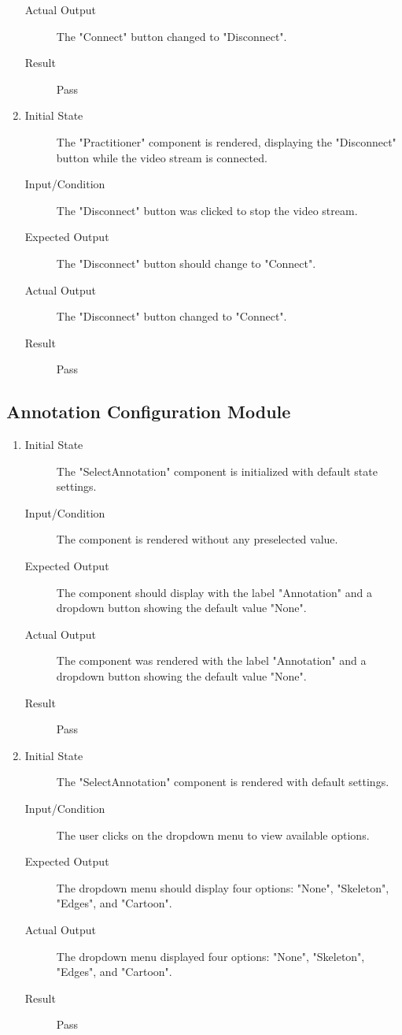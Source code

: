 \documentclass[12pt, titlepage]{article}
\begin{document}
\begin{enumerate}[UT-PV1]
\begin{description}
    \item[Actual Output]  The "Connect" button changed to "Disconnect".
    \item[Result] Pass
    \end{description}
  \item \label{UT-PV4}
    \begin{description}
    \item[Initial State] The "Practitioner" component is rendered, displaying the "Disconnect" button while the video stream is connected.
    \item[Input/Condition] The "Disconnect" button was clicked to stop the video stream.
    \item[Expected Output] The "Disconnect" button should change to "Connect".
    \item[Actual Output] The "Disconnect" button changed to "Connect".
    \item[Result] Pass
    \end{description}
\end{enumerate}

\subsection{Annotation Configuration Module}
\begin{enumerate}[UT-AC1]
  \item \label{UT-AC1}
    \begin{description}
    \item[Initial State] The "SelectAnnotation" component is initialized with default state settings.
    \item[Input/Condition] The component is rendered without any preselected value.
    \item[Expected Output] The component should display with the label "Annotation" and a dropdown button showing the default value "None".
    \item[Actual Output] The component was rendered with the label "Annotation" and a dropdown button showing the default value "None".
    \item[Result] Pass
    \end{description}
  \item \label{UT-AC2}
    \begin{description}
    \item[Initial State] The "SelectAnnotation" component is rendered with default settings.
    \item[Input/Condition] The user clicks on the dropdown menu to view available options.
    \item[Expected Output] The dropdown menu should display four options: "None", "Skeleton", "Edges", and "Cartoon".
    \item[Actual Output] The dropdown menu displayed four options: "None", "Skeleton", "Edges", and "Cartoon".
    \item[Result] Pass
    \end{description}
\end{enumerate}
\end{document}
